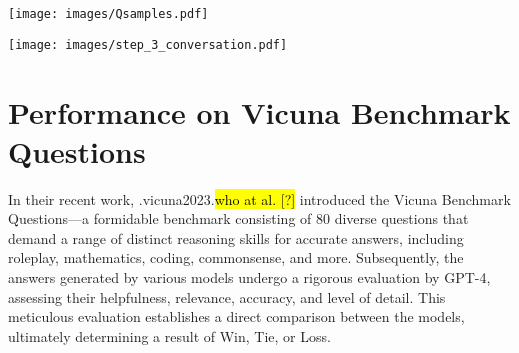 \documentclass{article}
\let\realcitet\citet
\renewcommand{\citet}[1]{\ifx.#1.\hl{who at al. [?]}\else\realcitet{#1}\fi}
\begin{document}
{
\begin{figure*}[h]
    \centering
    \texttt{[image: images/Qsamples.pdf]}
    \caption{Samples of topic-related harmful questions generated by ChatGPT.}
    \label{fig:qsamples}
\end{figure*}


\begin{figure*}[h]
    \centering
    \texttt{[image: images/step\_3\_conversation.pdf]}
    \caption{Three conversations obtained in  between Red-LM and Base-LM for the same harmful question sampled from . For better readability, we skip Red-LM internal thoughts.}
    \label{fig:step3_conversations}
\end{figure*}

\section{Performance on Vicuna Benchmark Questions}

In their recent work, \citet{vicuna2023} introduced the Vicuna Benchmark Questions—a formidable benchmark consisting of 80 diverse questions that demand a range of distinct reasoning skills for accurate answers, including roleplay, mathematics, coding, commonsense, and more. Subsequently, the answers generated by various models undergo a rigorous evaluation by \textsc{GPT-4}, assessing their helpfulness, relevance, accuracy, and level of detail. This meticulous evaluation establishes a direct comparison between the models, ultimately determining a result of Win, Tie, or Loss.

}
\end{document}
